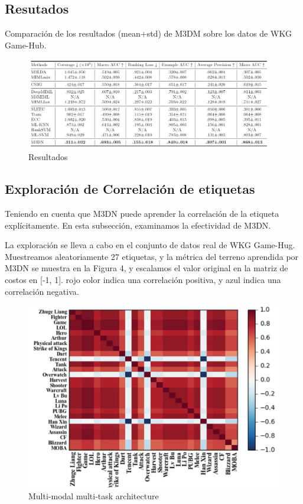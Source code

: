 \documentclass[conference]{IEEEtran}
\begin{document}
\subsection{Resutados}

Comparación de los resultados (mean+std) de M3DM sobre los datos de WKG Game-Hub.

 \begin{figure}
  \includegraphics[width=\textwidth,height=4cm]{figura5.png}
  \caption{Resultados}
  \label{fig}
\end{figure}

\subsection{Exploración de Correlación de etiquetas}

Teniendo en cuenta que M3DN puede aprender la correlación de la etiqueta explícitamente.
En esta subsección, examinamos la efectividad de M3DN.

La exploración se lleva a cabo en el conjunto de datos  real de
WKG Game-Hug. Muestreamos aleatoriamente 27 etiquetas, y
la métrica del terreno aprendida por M3DN se muestra en la Figura 4, y
escalamos el valor original en la matriz de costos en [-1, 1]. rojo
color indica una correlación positiva, y azul indica una correlación negativa.
\begin{figure}
\centerline{\includegraphics[width=\textwidth,width=9cm]{figura6.png}}
\caption{Multi-modal multi-task architecture}
\label{fig}
\end{figure}
\end{document}
